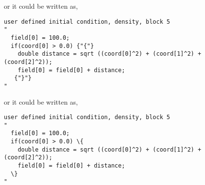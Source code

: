 \noindent
or it could be written as,
%
{\ttfamily \begin{verbatim}
user defined initial condition, density, block 5
"
  field[0] = 100.0;
  if(coord[0] > 0.0) {"{"}
    double distance = sqrt ((coord[0]^2) + (coord[1]^2) + (coord[2]^2));
    field[0] = field[0] + distance;
   {"}"}
"
\end{verbatim}
}

\noindent
or it could be written as,
%
{\ttfamily \begin{verbatim}
user defined initial condition, density, block 5
"
  field[0] = 100.0;
  if(coord[0] > 0.0) \{
    double distance = sqrt ((coord[0]^2) + (coord[1]^2) + (coord[2]^2));
    field[0] = field[0] + distance;
  \}
"
\end{verbatim}
}
